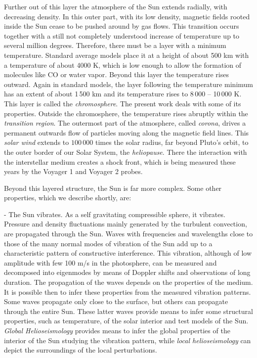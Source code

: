 Further out of this layer the atmosphere of the Sun extends radially, with decreasing density. In this outer part, with its low density, magnetic fields rooted inside the Sun cease to be pushed around by gas flows. This transition occurs together with a still not completely understood increase of temperature up to several million degrees. Therefore,  there must be a layer with a minimum temperature. Standard average models place it at a height of about 500 km with a temperature of about 4000 K, which is low enough to allow the formation of molecules like CO or water vapor. Beyond this layer the temperature rises outward. Again in standard models, the layer following the temperature minimum has an extent of about 1\,500 km and its temperature rises to 8\,000 -- 10\,000 K. This layer is called the \emph{chromosphere}. The present work deals with some of its properties. Outside the chromosphere, the temperature rises abruptly within the \emph{transition region}. The outermost part of the atmosphere, called \emph{corona}, drives a permanent outwards flow of particles moving along the magnetic field lines. This \emph{solar wind} extends to $100\,000$ times the solar radius, far beyond Pluto's orbit, to the outer border of our Solar System, the \emph{heliopause}. There the interaction with the interstellar medium creates a shock front, which is being measured these years by the Voyager 1 and Voyager 2 probes.

Beyond this layered structure, the Sun is far more complex. Some other properties, which we describe shortly, are: 

- The Sun vibrates. As a self gravitating compressible sphere, it vibrates. Pressure and density fluctuations mainly generated by the turbulent convection, are propagated through the Sun. Waves with frequencies and wavelengths close to those of the many normal modes of vibration of the Sun add up to a characteristic pattern of constructive 
interference. This vibration, although of low amplitude with few 100 m/s in the photosphere, can be measured and decomposed into eigenmodes by means of Doppler shifts and observations of long duration. The propagation of the waves depends on the properties of the medium. It is possible then to infer these properties from the measured vibration patterns. Some waves propagate only  close to  the surface, but others can propagate through the entire Sun. These latter waves provide means to infer some structural properties, such as temperature, of the solar interior and test models of the Sun.  
\emph{Global Helioseismology} provides means to infer the global properties of the interior of the Sun studying the vibration pattern, while \emph{local helioseismology} can depict the surroundings of the local perturbations.

